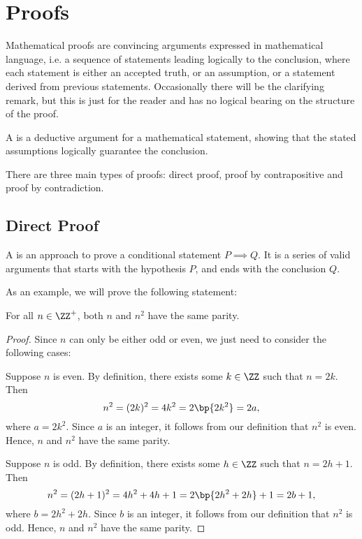 \section{Proofs}

Mathematical proofs are convincing arguments expressed in mathematical language, i.e. a sequence of statements leading logically to the conclusion, where each statement is either an accepted truth, or an assumption, or a statement derived from previous statements. Occasionally there will be the clarifying remark, but this is just for the reader and has no logical bearing on the structure of the proof.

\begin{definition}
    A  is a deductive argument for a mathematical statement, showing that the stated assumptions logically guarantee the conclusion.
\end{definition}

There are three main types of proofs: direct proof, proof by contrapositive and proof by contradiction.

\subsection{Direct Proof}

A  is an approach to prove a conditional statement $P \implies Q$. It is a series of valid arguments that starts with the hypothesis $P$, and ends with the conclusion $Q$.

As an example, we will prove the following statement:

\begin{statement}
    For all $n \in \ZZ^+$, both $n$ and $n^2$ have the same parity.
\end{statement}
\begin{proof}
    Since $n$ can only be either odd or even, we just need to consider the following cases:

     Suppose $n$ is even. By definition, there exists some $k \in \ZZ$ such that $n = 2k$. Then \[n^2 = (2k)^2 = 4k^2 = 2\bp{2k^2} = 2a,\] where $a = 2k^2$. Since $a$ is an integer, it follows from our definition that $n^2$ is even. Hence, $n$ and $n^2$ have the same parity.

     Suppose $n$ is odd. By definition, there exists some $h \in \ZZ$ such that $n = 2h + 1$. Then \[n^2 = (2h+1)^2 = 4h^2 + 4h + 1 = 2\bp{2h^2 + 2h} + 1 = 2b + 1,\] where $b = 2h^2 + 2h$. Since $b$ is an integer, it follows from our definition that $n^2$ is odd. Hence, $n$ and $n^2$ have the same parity.
\end{proof}

